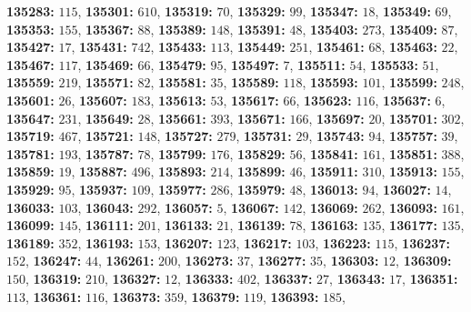 \textsf{\bfseries 135283:} $115$, \textsf{\bfseries 135301:} $610$, \textsf{\bfseries 135319:} $70$, \textsf{\bfseries 135329:} $99$, \textsf{\bfseries 135347:} $18$, \textsf{\bfseries 135349:} $69$, \textsf{\bfseries 135353:} $155$, \textsf{\bfseries 135367:} $88$, \textsf{\bfseries 135389:} $148$, \textsf{\bfseries 135391:} $48$, \textsf{\bfseries 135403:} $273$, \textsf{\bfseries 135409:} $87$, \textsf{\bfseries 135427:} $17$, \textsf{\bfseries 135431:} $742$, \textsf{\bfseries 135433:} $113$, \textsf{\bfseries 135449:} $251$, \textsf{\bfseries 135461:} $68$, \textsf{\bfseries 135463:} $22$, \textsf{\bfseries 135467:} $117$, \textsf{\bfseries 135469:} $66$, \textsf{\bfseries 135479:} $95$, \textsf{\bfseries 135497:} $7$, \textsf{\bfseries 135511:} $54$, \textsf{\bfseries 135533:} $51$, \textsf{\bfseries 135559:} $219$, \textsf{\bfseries 135571:} $82$, \textsf{\bfseries 135581:} $35$, \textsf{\bfseries 135589:} $118$, \textsf{\bfseries 135593:} $101$, \textsf{\bfseries 135599:} $248$, \textsf{\bfseries 135601:} $26$, \textsf{\bfseries 135607:} $183$, \textsf{\bfseries 135613:} $53$, \textsf{\bfseries 135617:} $66$, \textsf{\bfseries 135623:} $116$, \textsf{\bfseries 135637:} $6$, \textsf{\bfseries 135647:} $231$, \textsf{\bfseries 135649:} $28$, \textsf{\bfseries 135661:} $393$, \textsf{\bfseries 135671:} $166$, \textsf{\bfseries 135697:} $20$, \textsf{\bfseries 135701:} $302$, \textsf{\bfseries 135719:} $467$, \textsf{\bfseries 135721:} $148$, \textsf{\bfseries 135727:} $279$, \textsf{\bfseries 135731:} $29$, \textsf{\bfseries 135743:} $94$, \textsf{\bfseries 135757:} $39$, \textsf{\bfseries 135781:} $193$, \textsf{\bfseries 135787:} $78$, \textsf{\bfseries 135799:} $176$, \textsf{\bfseries 135829:} $56$, \textsf{\bfseries 135841:} $161$, \textsf{\bfseries 135851:} $388$, \textsf{\bfseries 135859:} $19$, \textsf{\bfseries 135887:} $496$, \textsf{\bfseries 135893:} $214$, \textsf{\bfseries 135899:} $46$, \textsf{\bfseries 135911:} $310$, \textsf{\bfseries 135913:} $155$, \textsf{\bfseries 135929:} $95$, \textsf{\bfseries 135937:} $109$, \textsf{\bfseries 135977:} $286$, \textsf{\bfseries 135979:} $48$, \textsf{\bfseries 136013:} $94$, \textsf{\bfseries 136027:} $14$, \textsf{\bfseries 136033:} $103$, \textsf{\bfseries 136043:} $292$, \textsf{\bfseries 136057:} $5$, \textsf{\bfseries 136067:} $142$, \textsf{\bfseries 136069:} $262$, \textsf{\bfseries 136093:} $161$, \textsf{\bfseries 136099:} $145$, \textsf{\bfseries 136111:} $201$, \textsf{\bfseries 136133:} $21$, \textsf{\bfseries 136139:} $78$, \textsf{\bfseries 136163:} $135$, \textsf{\bfseries 136177:} $135$, \textsf{\bfseries 136189:} $352$, \textsf{\bfseries 136193:} $153$, \textsf{\bfseries 136207:} $123$, \textsf{\bfseries 136217:} $103$, \textsf{\bfseries 136223:} $115$, \textsf{\bfseries 136237:} $152$, \textsf{\bfseries 136247:} $44$, \textsf{\bfseries 136261:} $200$, \textsf{\bfseries 136273:} $37$, \textsf{\bfseries 136277:} $35$, \textsf{\bfseries 136303:} $12$, \textsf{\bfseries 136309:} $150$, \textsf{\bfseries 136319:} $210$, \textsf{\bfseries 136327:} $12$, \textsf{\bfseries 136333:} $402$, \textsf{\bfseries 136337:} $27$, \textsf{\bfseries 136343:} $17$, \textsf{\bfseries 136351:} $113$, \textsf{\bfseries 136361:} $116$, \textsf{\bfseries 136373:} $359$, \textsf{\bfseries 136379:} $119$, \textsf{\bfseries 136393:} $185$, 
